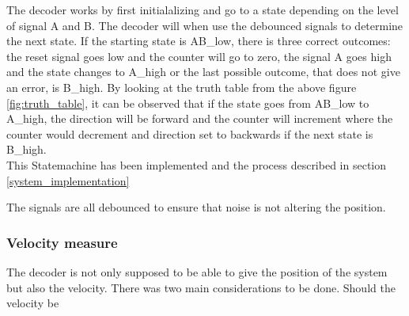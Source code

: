 \documentclass[../../../main]{subfiles}
\begin{document}
The decoder works by first initialalizing and go to a state depending on the level of signal A and B. The decoder will when use the debounced signals to determine the next state. If the starting state is AB\_low, there is three correct outcomes: the reset signal goes low and the counter will go to zero, the signal A goes high and the state changes to A\_high or the last possible outcome, that does not give an error, is B\_high. By looking at the truth table from the above figure \ref{fig:truth_table}, it can be observed that if the state goes from AB\_low to A\_high, the direction will be forward and the counter will increment where the counter would decrement and direction set to backwards if the next state is B\_high.\\ This Statemachine has been implemented and the process described in section \ref{system_implementation}


The signals are all debounced to ensure that noise is not altering the position.

\subsubsection{Velocity measure}
The decoder is not only supposed to be able to give the position of the system but also the velocity. There was two main considerations to be done. Should the velocity be 
\end{document}
